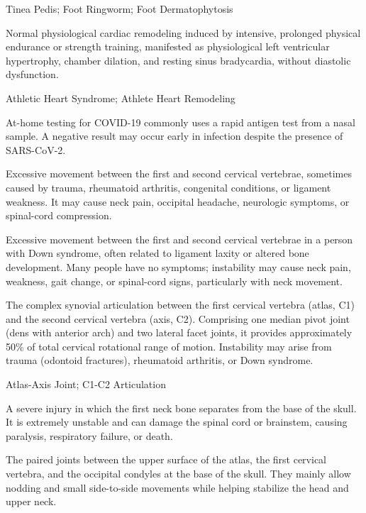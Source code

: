 \synonyms
Tinea Pedis; Foot Ringworm; Foot Dermatophytosis

 Normal physiological cardiac remodeling induced by intensive, prolonged physical endurance or strength training, manifested as physiological left ventricular hypertrophy, chamber dilation, and resting sinus bradycardia, without diastolic dysfunction.

\synonyms
Athletic Heart Syndrome; Athlete Heart Remodeling

 At-home testing for COVID-19 commonly uses a rapid antigen test from a nasal sample. A negative result may occur early in infection despite the presence of SARS-CoV-2.


 Excessive movement between the first and second cervical vertebrae, sometimes caused by trauma, rheumatoid arthritis, congenital conditions, or ligament weakness. It may cause neck pain, occipital headache, neurologic symptoms, or spinal-cord compression.

 Excessive movement between the first and second cervical vertebrae in a person with Down syndrome, often related to ligament laxity or altered bone development. Many people have no symptoms; instability may cause neck pain, weakness, gait change, or spinal-cord signs, particularly with neck movement.

 The complex synovial articulation between the first cervical vertebra (atlas, C1) and the second cervical vertebra (axis, C2). Comprising one median pivot joint (dens with anterior arch) and two lateral facet joints, it provides approximately 50\% of total cervical rotational range of motion. Instability may arise from trauma (odontoid fractures), rheumatoid arthritis, or Down syndrome.

\synonyms
Atlas-Axis Joint; C1-C2 Articulation

 A severe injury in which the first neck bone separates from the base of the skull. It is extremely unstable and can damage the spinal cord or brainstem, causing paralysis, respiratory failure, or death.

 The paired joints between the upper surface of the atlas, the first cervical vertebra, and the occipital condyles at the base of the skull. They mainly allow nodding and small side-to-side movements while helping stabilize the head and upper neck.

